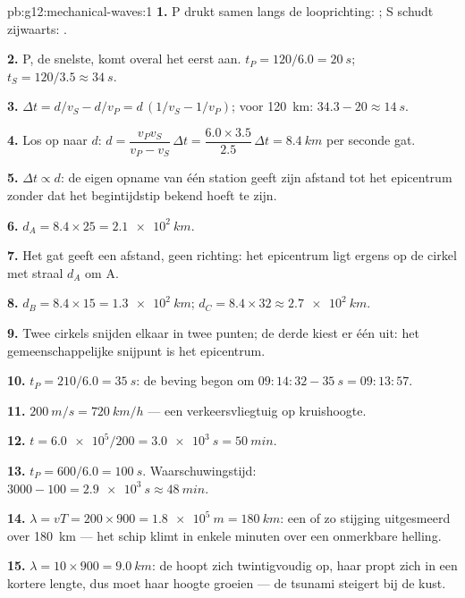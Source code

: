 \begin{solution}{pb:g12:mechanical-waves:1}
\textbf{1.} P drukt samen langs de looprichting: ; S schudt
zijwaarts: .

\textbf{2.} P, de snelste, komt overal het eerst aan.
$t_P = 120/6.0 = \qty{20}{s}$; $t_S = 120/3.5 \approx \qty{34}{s}$.

\textbf{3.} $\Delta t = d/v_S - d/v_P = d\,(1/v_S - 1/v_P)$; voor
\qty{120}{km}: $34.3 - 20 \approx \qty{14}{s}$.

\textbf{4.} Los op naar $d$: $d = \dfrac{v_P v_S}{v_P - v_S}\,\Delta t
= \dfrac{6.0 \times 3.5}{2.5}\,\Delta t = \qty{8.4}{km}$ per seconde
gat.

\textbf{5.} $\Delta t \propto d$: de eigen opname van één station geeft
zijn afstand tot het epicentrum zonder dat het begintijdstip bekend hoeft
te zijn.

\textbf{6.} $d_A = 8.4 \times 25 = \qty{2.1e2}{km}$.

\textbf{7.} Het gat geeft een afstand, geen richting: het epicentrum ligt
ergens op de cirkel met straal $d_A$ om A.

\textbf{8.} $d_B = 8.4 \times 15 = \qty{1.3e2}{km}$;
$d_C = 8.4 \times 32 \approx \qty{2.7e2}{km}$.

\textbf{9.} Twee cirkels snijden elkaar in twee punten; de derde kiest er
één uit: het gemeenschappelijke snijpunt is het epicentrum.

\textbf{10.} $t_P = 210/6.0 = \qty{35}{s}$: de beving begon om
$09{:}14{:}32 - \qty{35}{s} = 09{:}13{:}57$.

\textbf{11.} $\qty{200}{m/s} = \qty{720}{km/h}$ --- een verkeersvliegtuig
op kruishoogte.

\textbf{12.} $t = \num{6.0e5}/200 = \qty{3.0e3}{s} = \qty{50}{min}$.

\textbf{13.} $t_P = 600/6.0 = \qty{100}{s}$. Waarschuwingstijd:
$3000 - 100 = \qty{2.9e3}{s} \approx \qty{48}{min}$.

\textbf{14.} $\lambda = vT = 200 \times 900 = \qty{1.8e5}{m} =
\qty{180}{km}$: een  of zo stijging uitgesmeerd over \qty{180}{km}
--- het schip klimt in enkele minuten over een onmerkbare helling.

\textbf{15.} $\lambda = 10 \times 900 = \qty{9.0}{km}$: de  hoopt
zich twintigvoudig op, haar  propt zich in een kortere lengte, dus
moet haar hoogte groeien --- de tsunami steigert bij de kust.


\end{solution}

